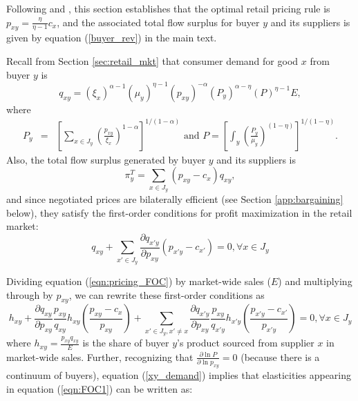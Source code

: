 \documentclass[12pt]{article} \usepackage{amsmath,amssymb,amsthm,geometry,graphicx,setspace,algorithm,algpseudocode,float}
\begin{document}
Following \citet{AtkesonBurstein2008} and \citet{HottmanReddingWeinstein2015}, this section establishes that the optimal retail pricing rule is $p_{xy}=\frac{\eta}{\eta-1}c_x$, and the associated total flow surplus for buyer $y$ and its suppliers is given by equation (\ref{buyer_rev}) in the main text.
\par
Recall from Section \ref{sec:retail_mkt} that consumer demand for good $x$ from buyer $y$ is 
\begin{equation}
\label{xy_demand}
    q_{xy} =\left( \xi _{x}\right) ^{\alpha -1} \left( \mu _{y}\right) ^{\eta
-1} \left( p_{xy}\right) ^{-\alpha
} \left( P_{y}\right) ^{\alpha -\eta }\left( P\right) ^{\eta -1}E, 
\end{equation}
where
\begin{align}
P_{y} &=&\left[ \sum_{x\in J_y}\left( \frac{p_{xy}}{\xi _{x}}\right)
^{1-\alpha }\right] ^{1/(1-\alpha )}\text{ and\ \ }P=\left[ \int_{y}\left( 
\frac{P_{y}}{\mu _{y}}\right) ^{(1-\eta )}\right] ^{1/(1-\eta )}.
\label{price_indices} 
\end{align}
Also, the total flow surplus generated by buyer $y$ and its suppliers is 
\begin{equation}
\pi_y^T =\sum_{x\in J_y}(p_{xy}-c_{x})q_{xy},
\label{tot_profit}
\end{equation}
and since negotiated prices are bilaterally efficient (see Section \ref{app:bargaining} below), they satisfy the first-order conditions for profit maximization in the retail market:
\begin{equation}
  q_{xy} + \sum_{x' \in J_y} \frac{\partial q_{x'y}}{\partial p_{xy}} (p_{x'y} - c_{x'}) = 0, \forall x\in J_y
  \label{eqn:pricing_FOC}
\end{equation}
\par
Dividing equation (\ref{eqn:pricing_FOC}) by market-wide sales ($E$) and multiplying through by $p_{xy}$, we can rewrite these first-order conditions as  
\begin{equation}
  h_{xy} + \frac{\partial q_{xy}}{\partial p_{xy}} \frac{p_{xy}}{q_{xy}} h_{xy}  \left(\frac{p_{xy}-c_{x}}{p_{xy}}  \right) + \sum_{x'\in J_y, x'\neq x} \frac{\partial q_{x'y}}{\partial p_{xy}} \frac{p_{xy}}{q_{x'y}}h_{x'y}  \left(\frac{p_{x'y}-c_{x'}}{p_{x'y}} \right) = 0, \forall x\in J_y
  \label{eqn:FOC1}
\end{equation}
where $h_{xy}=\frac{p_{xy}q_{xy}}{E}$ is the share of buyer $y$'s product sourced from supplier $x$ in market-wide sales.
Further, recognizing that  $\frac{\partial \ln P}{\partial \ln p_{xy}}=0$ (because there is a continuum of buyers), equation (\ref{xy_demand}) implies that elasticities appearing in equation (\ref{eqn:FOC1}) can be written as:
\end{document}
